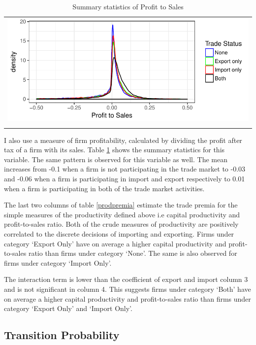 \documentclass[12pt]{article}
\begin{document}
\begin{center}
\begin{table}[H]
\caption{Summary statistics of Profit to Sales}
\label{tab:pts}
\begin{tabular}{c}
 \includegraphics{./PICS/denspatsales.pdf}   \\ 
   \\  
\end{tabular}
\end{table}
\end{center}

I also use a measure of firm profitability, calculated by dividing the profit
after tax of
a firm with its sales. Table \ref{tab:pts} shows the summary
statistics for this variable. The same pattern is observed for this variable as well. The mean increases from -0.1 when a firm is not participating in
the trade market to -0.03 and  -0.06 when a firm is participating in
import and export respectively to 0.01 when a firm is participating in
both of the trade market activities.  

The last two columns of table \ref{prodpremia} estimate the trade
premia for the simple measures of the productivity defined above i.e
capital productivity and profit-to-sales ratio. Both
of the crude measures of productivity are positively correlated to the discrete
decisions of importing and exporting.  Firms under category `Export
Only' have on average a  higher
capital productivity and profit-to-sales ratio than firms under
category `None'. The same is also observed for firms under category
`Import Only'.
  
 The interaction term is lower than the coefficient of export and
 import column 3 and 
is not significant in column 4. This suggests firms under category
`Both' have on average a higher capital productivity and profit-to-sales ratio than
firms under category `Export Only' and `Import Only'. 

\subsection{Transition Probability}
\end{document}
